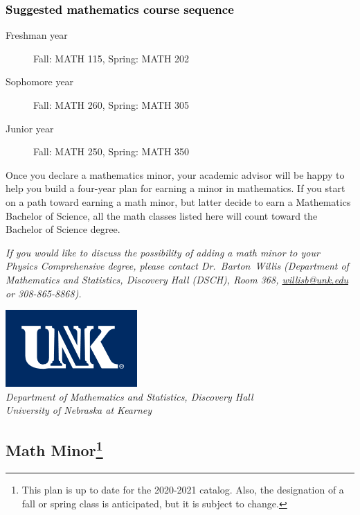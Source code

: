 \documentclass[10pt]{article}
\makeatletter
\newcommand{\contactbw}{\mbox{Dr.\ Barton Willis} (Department of Mathematics and Statistics,  Discovery Hall (DSCH), Room 368,
\href{mailto:willisb@unk.edu}{willisb@unk.edu} or 308-865-8868)}
\makeatother
\begin{document}
\subsubsection*{\textcolor{black}{Suggested mathematics course sequence}}

\begin{description}
   \item[\phantom{xxx} Freshman year] Fall: MATH 115, Spring:  MATH 202
      \item[\phantom{xxx} Sophomore year]  Fall: MATH 260,  Spring: MATH 305
     \item[\phantom{xxx} Junior year]  Fall: MATH 250,  Spring: MATH 350
 \end{description}
  \vspace{0.1in}

 \noindent Once you declare a mathematics minor, your academic advisor will be happy to help you build a four-year plan for earning a minor in mathematics.  If you start on a path toward earning a math minor, but latter decide to earn a  Mathematics Bachelor of Science, all the math classes listed here will count toward the Bachelor of Science degree.

   \vspace{0.1in}

\noindent \textcolor{unkblue}{\emph{If you would like to discuss the possibility of  adding a math minor to your Physics Comprehensive degree, please contact \contactbw.}}

\newpage
\begin{flushleft}
\includegraphics[scale=0.25]{unk-logo}\\
 \emph{\textcolor{unkblue}{Department of Mathematics and Statistics, Discovery Hall}} \\
  \emph{\textcolor{unkblue}{University of Nebraska at Kearney}}
\end{flushleft}

\subsection*{\textbf{\textcolor{unkblue}{Math Minor\footnote[1]{This plan is up to date for the 2020-2021 catalog. Also, the designation of a fall or spring class is anticipated, but it is subject to change.
}}}}
\end{document}

